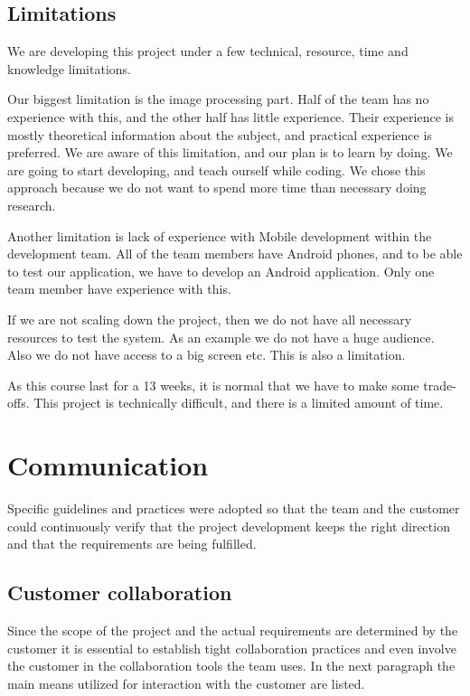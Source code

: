 \subsection{Limitations}
\label{sec:limitations}
We are developing this project under a few technical, resource, time and knowledge limitations. 

Our biggest limitation is the image processing part. Half of the team has no experience with this, and the other half has little experience. Their experience is mostly theoretical information about the subject, and practical experience is preferred. We are aware of this limitation, and our plan is to learn by doing. We are going to start developing, and teach ourself while coding. We chose this approach because we do not want to spend more time than necessary doing research.

Another limitation is lack of experience with Mobile development within the development team. All of the team members have Android phones, and to be able to test our application, we have to develop an Android application. Only one team member have experience with this. 

If we are not scaling down the project, then we do not have all necessary resources to test the system. As an example we do not have a huge audience. Also  we do not have access to a big screen etc. This is also a limitation.  

As this course last for a 13 weeks, it is normal that we have to make some trade-offs.
This project is technically difficult, and there is a limited amount of time. 


\section{Communication}
Specific guidelines and practices were adopted
so that the team and the customer could continuously verify that the project development keeps the right direction and that the requirements are being fulfilled.

\subsection{Customer collaboration}
Since the scope of the project and the actual requirements are determined by the customer it is essential to establish tight collaboration practices and even involve the customer in the collaboration tools the team uses. In the next paragraph the main means utilized for interaction with the customer are listed. 

